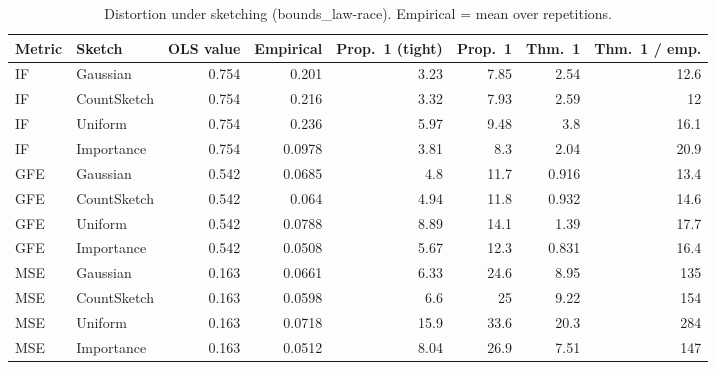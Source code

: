 \begin{table}[t]
\centering
\small
\begin{tabular}{llrrrrrr}
\toprule
Metric & Sketch & OLS value & Empirical & Prop.~1 (tight) & Prop.~1 & Thm.~1 & Thm.~1 / emp. \\
\midrule
IF & Gaussian & 0.754 & 0.201 & 3.23 & 7.85 & 2.54 & 12.6 \\
IF & CountSketch & 0.754 & 0.216 & 3.32 & 7.93 & 2.59 & 12 \\
IF & Uniform & 0.754 & 0.236 & 5.97 & 9.48 & 3.8 & 16.1 \\
IF & Importance & 0.754 & 0.0978 & 3.81 & 8.3 & 2.04 & 20.9 \\
\midrule
GFE & Gaussian & 0.542 & 0.0685 & 4.8 & 11.7 & 0.916 & 13.4 \\
GFE & CountSketch & 0.542 & 0.064 & 4.94 & 11.8 & 0.932 & 14.6 \\
GFE & Uniform & 0.542 & 0.0788 & 8.89 & 14.1 & 1.39 & 17.7 \\
GFE & Importance & 0.542 & 0.0508 & 5.67 & 12.3 & 0.831 & 16.4 \\
\midrule
MSE & Gaussian & 0.163 & 0.0661 & 6.33 & 24.6 & 8.95 & 135 \\
MSE & CountSketch & 0.163 & 0.0598 & 6.6 & 25 & 9.22 & 154 \\
MSE & Uniform & 0.163 & 0.0718 & 15.9 & 33.6 & 20.3 & 284 \\
MSE & Importance & 0.163 & 0.0512 & 8.04 & 26.9 & 7.51 & 147 \\
\bottomrule
\end{tabular}
\caption{Distortion under sketching (bounds_law-race). Empirical = mean over repetitions.}
\label{tab:bounds_law-race}
\end{table}